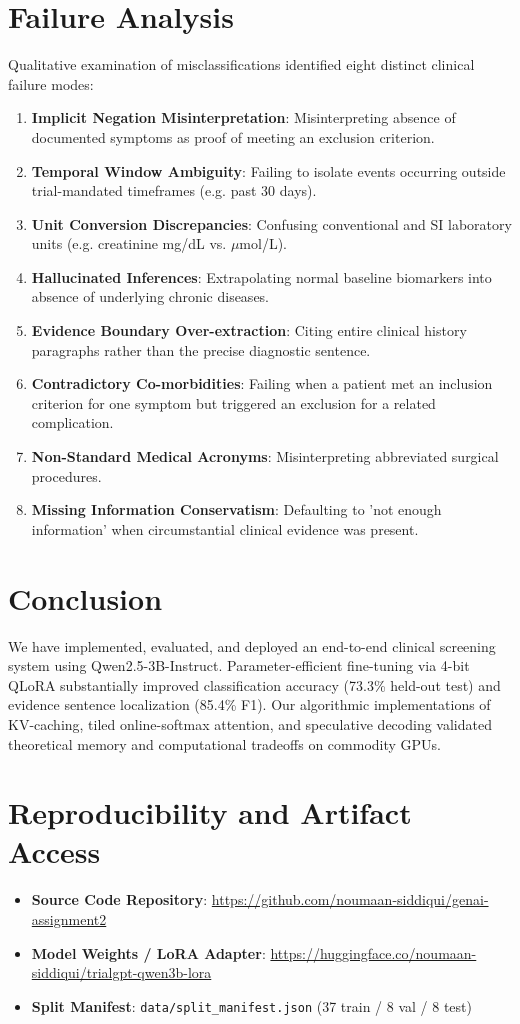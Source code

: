 \documentclass[conference]{IEEEtran}
\begin{document}
\section{Failure Analysis}
Qualitative examination of misclassifications identified eight distinct clinical failure modes:
\begin{enumerate}
    \item \textbf{Implicit Negation Misinterpretation}: Misinterpreting absence of documented symptoms as proof of meeting an exclusion criterion.
    \item \textbf{Temporal Window Ambiguity}: Failing to isolate events occurring outside trial-mandated timeframes (e.g. past 30 days).
    \item \textbf{Unit Conversion Discrepancies}: Confusing conventional and SI laboratory units (e.g. creatinine mg/dL vs. $\mu$mol/L).
    \item \textbf{Hallucinated Inferences}: Extrapolating normal baseline biomarkers into absence of underlying chronic diseases.
    \item \textbf{Evidence Boundary Over-extraction}: Citing entire clinical history paragraphs rather than the precise diagnostic sentence.
    \item \textbf{Contradictory Co-morbidities}: Failing when a patient met an inclusion criterion for one symptom but triggered an exclusion for a related complication.
    \item \textbf{Non-Standard Medical Acronyms}: Misinterpreting abbreviated surgical procedures.
    \item \textbf{Missing Information Conservatism}: Defaulting to 'not enough information' when circumstantial clinical evidence was present.
\end{enumerate}

\section{Conclusion}
We have implemented, evaluated, and deployed an end-to-end clinical screening system using Qwen2.5-3B-Instruct. Parameter-efficient fine-tuning via 4-bit QLoRA substantially improved classification accuracy (73.3\% held-out test) and evidence sentence localization (85.4\% F1). Our algorithmic implementations of KV-caching, tiled online-softmax attention, and speculative decoding validated theoretical memory and computational tradeoffs on commodity GPUs.

\section*{Reproducibility and Artifact Access}
\begin{itemize}
    \item \textbf{Source Code Repository}: \url{https://github.com/noumaan-siddiqui/genai-assignment2}
    \item \textbf{Model Weights / LoRA Adapter}: \url{https://huggingface.co/noumaan-siddiqui/trialgpt-qwen3b-lora}
    \item \textbf{Split Manifest}: \texttt{data/split\_manifest.json} (37 train / 8 val / 8 test)
\end{itemize}
\end{document}
